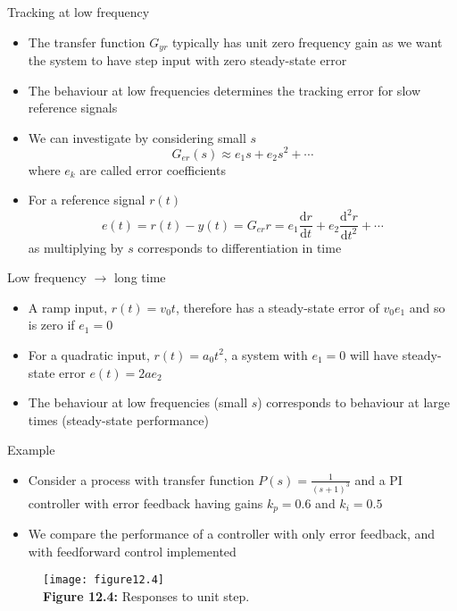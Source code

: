 \documentclass{beamer-control}
\begin{document}
\begin{frame}{Tracking at low frequency}
	\begin{itemize}
		\item The transfer function $G_{yr}$ typically has unit zero frequency gain as we want the system to have step input with zero steady-state error
		\item The behaviour at low frequencies determines the tracking error for slow reference signals
		\item We can investigate by considering small $s$
		\[G_{er}(s)\approx e_1 s+ e_2 s^2+\cdots\]
		where $e_k$ are called error coefficients
		\item For a reference signal $r(t)$
		\[e(t)=r(t)-y(t)=G_{er} r= e_1 \frac{\mathrm{d}r}{\mathrm{d}t}+ e_2 \frac{\mathrm{d}^2r}{\mathrm{d}t^2}+ \cdots\]
		as multiplying by $s$ corresponds to differentiation in time
	\end{itemize}
\end{frame}


\begin{frame}{Low frequency $\rightarrow$ long time}
	\begin{itemize}
		\item A ramp input, $r(t)=v_0t$, therefore has a steady-state error of $v_0e_1$ and so is zero if $e_1=0$
		\item For a quadratic input, $r(t)=a_0 t^2$, a system with $e_1=0$ will have steady-state error $e(t)=2ae_2$
		\item The behaviour at low frequencies (small $s$) corresponds to behaviour at large times (steady-state performance)
	\end{itemize}
\end{frame}




\begin{frame}{Example}
\begin{itemize}
	\item Consider a process with transfer function $P(s)=\frac{1}{(s+1)^3}$
	and a PI controller with error feedback having gains $k_p=0.6$ and $k_i=0.5$
	\item We compare the performance of a controller with only error feedback, and  with feedforward control implemented
\end{itemize}
\begin{figure}
	\centering
	\texttt{[image: figure12.4]}\\
	\vspace{-0.2cm}
	\textbf{Figure 12.4:} Responses to unit step.
\end{figure}
\end{frame}
\end{document}
